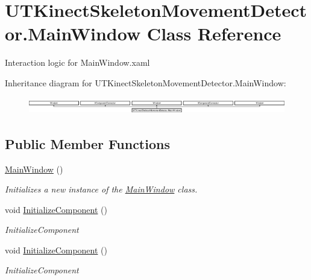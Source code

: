 \hypertarget{class_u_t_kinect_skeleton_movement_detector_1_1_main_window}{\section{U\-T\-Kinect\-Skeleton\-Movement\-Detector.\-Main\-Window Class Reference}
\label{class_u_t_kinect_skeleton_movement_detector_1_1_main_window}
}


Interaction logic for Main\-Window.\-xaml  


Inheritance diagram for U\-T\-Kinect\-Skeleton\-Movement\-Detector.\-Main\-Window\-:\begin{figure}[H]
\begin{center}
\leavevmode
\includegraphics[height=0.746667cm]{class_u_t_kinect_skeleton_movement_detector_1_1_main_window}
\end{center}
\end{figure}
\subsection*{Public Member Functions}
\begin{DoxyCompactItemize}
\item 
\hyperlink{class_u_t_kinect_skeleton_movement_detector_1_1_main_window_a5ab15131acc3a1f24f1584232412a5f5}{Main\-Window} ()
\begin{DoxyCompactList}\small\item\em Initializes a new instance of the \hyperlink{class_u_t_kinect_skeleton_movement_detector_1_1_main_window}{Main\-Window} class. \end{DoxyCompactList}\item 
void \hyperlink{class_u_t_kinect_skeleton_movement_detector_1_1_main_window_a6b89ad1956b2aba773a1b283632bc047}{Initialize\-Component} ()
\begin{DoxyCompactList}\small\item\em Initialize\-Component \end{DoxyCompactList}\item 
void \hyperlink{class_u_t_kinect_skeleton_movement_detector_1_1_main_window_a6b89ad1956b2aba773a1b283632bc047}{Initialize\-Component} ()
\begin{DoxyCompactList}\small\item\em Initialize\-Component \end{DoxyCompactList}\end{DoxyCompactItemize}


